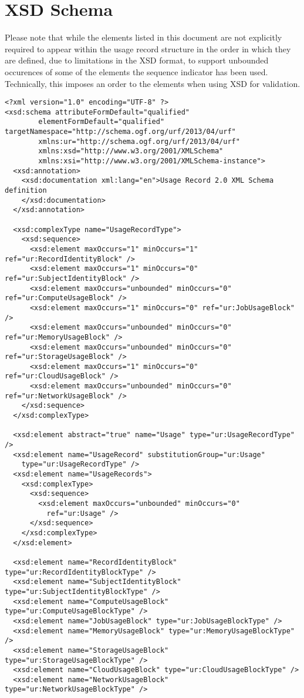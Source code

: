 
\section{XSD Schema}

Please note that while the elements listed in this document are not explicitly required to appear within the usage record structure in the order in which they are defined, due to limitations in the XSD format, to support unbounded occurences of some of the elements the sequence indicator has been used. Technically, this imposes an order to the elements when using XSD for validation.

\small\begin{verbatim}
<?xml version="1.0" encoding="UTF-8" ?>
<xsd:schema attributeFormDefault="qualified" 
	    elementFormDefault="qualified" targetNamespace="http://schema.ogf.org/urf/2013/04/urf" 
	    xmlns:ur="http://schema.ogf.org/urf/2013/04/urf" 
	    xmlns:xsd="http://www.w3.org/2001/XMLSchema" 
	    xmlns:xsi="http://www.w3.org/2001/XMLSchema-instance">
  <xsd:annotation>
    <xsd:documentation xml:lang="en">Usage Record 2.0 XML Schema definition
    </xsd:documentation>
  </xsd:annotation>

  <xsd:complexType name="UsageRecordType">
    <xsd:sequence>
      <xsd:element maxOccurs="1" minOccurs="1" ref="ur:RecordIdentityBlock" />
      <xsd:element maxOccurs="1" minOccurs="0" ref="ur:SubjectIdentityBlock" />
      <xsd:element maxOccurs="unbounded" minOccurs="0" ref="ur:ComputeUsageBlock" />
      <xsd:element maxOccurs="1" minOccurs="0" ref="ur:JobUsageBlock" />
      <xsd:element maxOccurs="unbounded" minOccurs="0" ref="ur:MemoryUsageBlock" />
      <xsd:element maxOccurs="unbounded" minOccurs="0" ref="ur:StorageUsageBlock" />
      <xsd:element maxOccurs="1" minOccurs="0" ref="ur:CloudUsageBlock" />
      <xsd:element maxOccurs="unbounded" minOccurs="0" ref="ur:NetworkUsageBlock" />
    </xsd:sequence>
  </xsd:complexType>
  
  <xsd:element abstract="true" name="Usage" type="ur:UsageRecordType" />
  <xsd:element name="UsageRecord" substitutionGroup="ur:Usage"
    type="ur:UsageRecordType" />
  <xsd:element name="UsageRecords">
    <xsd:complexType>
      <xsd:sequence>
        <xsd:element maxOccurs="unbounded" minOccurs="0"
          ref="ur:Usage" />
      </xsd:sequence>
    </xsd:complexType>
  </xsd:element>

  <xsd:element name="RecordIdentityBlock" type="ur:RecordIdentityBlockType" />
  <xsd:element name="SubjectIdentityBlock" type="ur:SubjectIdentityBlockType" />
  <xsd:element name="ComputeUsageBlock" type="ur:ComputeUsageBlockType" />
  <xsd:element name="JobUsageBlock" type="ur:JobUsageBlockType" />
  <xsd:element name="MemoryUsageBlock" type="ur:MemoryUsageBlockType" />
  <xsd:element name="StorageUsageBlock" type="ur:StorageUsageBlockType" />
  <xsd:element name="CloudUsageBlock" type="ur:CloudUsageBlockType" />
  <xsd:element name="NetworkUsageBlock" type="ur:NetworkUsageBlockType" />
  

\end{verbatim}
